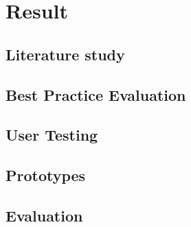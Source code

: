 \chapter{Result}
\label{chap:result}

\section{Literature study}
%
\section{Best Practice Evaluation}
%
\section{User Testing}
%
\section{Prototypes}
%
\section{Evaluation}
%
